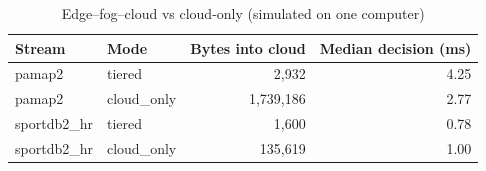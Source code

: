 \begin{table}[t]\centering\caption{Edge--fog--cloud vs cloud-only (simulated on one computer)}\label{tab:tiers}
\footnotesize\begin{tabular}{llrr}\toprule
Stream & Mode & Bytes into cloud & Median decision (ms) \\\midrule
pamap2 & tiered & 2,932 & 4.25 \\
pamap2 & cloud\_only & 1,739,186 & 2.77 \\
sportdb2\_hr & tiered & 1,600 & 0.78 \\
sportdb2\_hr & cloud\_only & 135,619 & 1.00 \\
\bottomrule\end{tabular}\end{table}
